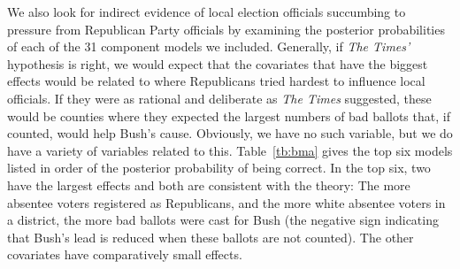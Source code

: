 \documentclass[11pt,titlepage]{article}
\begin{document}
We also look for indirect evidence of local election officials
succumbing to pressure from Republican Party officials by examining
the posterior probabilities of each of the 31 component models we
included.  Generally, if \emph{The Times'} hypothesis is right, we
would expect that the covariates that have the biggest effects would
be related to where Republicans tried hardest to influence local
officials.  If they were as rational and deliberate as \emph{The
  Times} suggested, these would be counties where they expected the
largest numbers of bad ballots that, if counted, would help Bush's
cause.  Obviously, we have no such variable, but we do have a variety
of variables related to this.  Table~\ref{tb:bma} gives the top six
models listed in order of the posterior probability of being correct.
In the top six, two have the largest effects and both are consistent
with the theory: The more absentee voters registered as Republicans,
and the more white absentee voters in a district, the more bad ballots
were cast for Bush (the negative sign indicating that Bush's lead is
reduced when these ballots are not counted).  The other covariates
have comparatively small effects.
\end{document}
